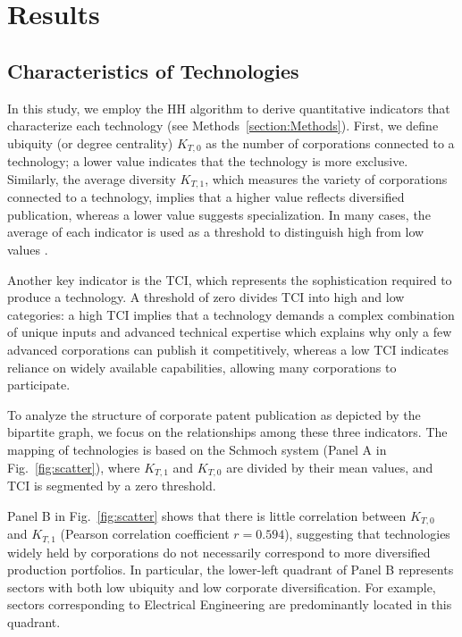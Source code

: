 \documentclass[fleqn,10pt]{wlscirep}
\begin{document}
\section*{Results} \label{section:Results}

\subsection*{Characteristics of Technologies} \label{subsection:characteristics}
In this study, we employ the HH algorithm to derive quantitative indicators that characterize each technology (see Methods~\ref{section:Methods}). First, we define ubiquity (or degree centrality) $K_{T,0}$ as the number of corporations connected to a technology; a lower value indicates that the technology is more exclusive. Similarly, the average diversity $K_{T,1}$, which measures the variety of corporations connected to a technology, implies that a higher value reflects diversified publication, whereas a lower value suggests specialization. In many cases, the average of each indicator is used as a threshold to distinguish high from low values \cite{Hidalgo2009,balland2017tci}.

Another key indicator is the TCI, which represents the sophistication required to produce a technology. A threshold of zero divides TCI into high and low categories: a high TCI implies that a technology demands a complex combination of unique inputs and advanced technical expertise which explains why only a few advanced corporations can publish it competitively, whereas a low TCI indicates reliance on widely available capabilities, allowing many corporations to participate.

To analyze the structure of corporate patent publication as depicted by the bipartite graph, we focus on the relationships among these three indicators. The mapping of technologies is based on the Schmoch system \cite{Schmoch2008} (Panel A in Fig.~\ref{fig:scatter}), where $K_{T,1}$ and $K_{T,0}$ are divided by their mean values, and TCI is segmented by a zero threshold.

Panel B in Fig.~\ref{fig:scatter} shows that there is little correlation between $K_{T,0}$ and $K_{T,1}$ (Pearson correlation coefficient $r=0.594$), suggesting that technologies widely held by corporations do not necessarily correspond to more diversified production portfolios. 
In particular, the lower-left quadrant of Panel B represents sectors with both low ubiquity and low corporate diversification. For example, sectors corresponding to Electrical Engineering are predominantly located in this quadrant.
\end{document}
